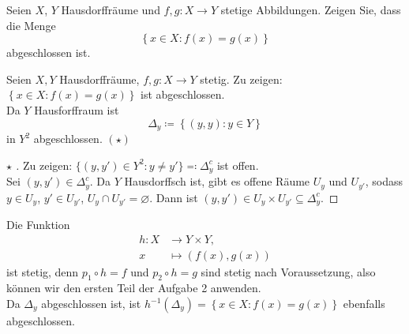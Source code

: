 \newpage
\begin{assignment}
  Seien \( X \), \( Y \) Hausdorffräume und \( f,g : X \to Y \) stetige Abbildungen. Zeigen Sie, dass die Menge
  \begin{equation*}
    \left \{ x \in X : f(x) = g(x) \right \}
  \end{equation*}
  abgeschlossen ist.
\end{assignment}
\begin{solution}
  Seien \( X, Y \) Hausdorffräume, \( f,g : X \to Y \) stetig. Zu zeigen: \( \left \{ x \in X : f(x) = g(x) \right \} \) ist abgeschlossen. \\
  Da \( Y \) Hausforffraum ist
  \begin{equation*}
    \Delta_y \coloneqq \left \{ (y,y): y \in Y \right \}
  \end{equation*}
  in \( Y^2 \) abgeschlossen. \( (\star) \) 
  \begin{proof}[ \( \star \) ]
    Zu zeigen: \( \{ (y, y') \in Y^2 : y \neq y' \} \eqqcolon \Delta_y^c \) ist offen. \\
    Sei \( (y,y') \in \Delta_y^c \). Da \( Y \) Hausdorffsch ist, gibt es offene Räume \( U_y \) und \( U_{y'} \), sodass \( y \in U_y \), \( y' \in U_{y'} \), \( U_y \cap U_{y'} = \varnothing \). Dann ist \( (y, y') \in U_y \times U_{y'} \subseteq \Delta_y^c \).
  \end{proof}
  Die Funktion
  \begin{align*}
    h : X &\to Y\times Y\text{,} \\
    x &\mapsto (f(x), g(x))
  \end{align*}
  ist stetig, denn \( p_1 \circ h = f \) und \( p_2 \circ h = g \) sind stetig nach Voraussetzung, also können wir den ersten Teil der Aufgabe 2 anwenden. \\
  Da \( \Delta_y \) abgeschlossen ist, ist \( h^{-1}(\Delta_y) = \left \{ x \in X : f(x) = g(x) \right \} \) ebenfalls abgeschlossen.
\end{solution}


